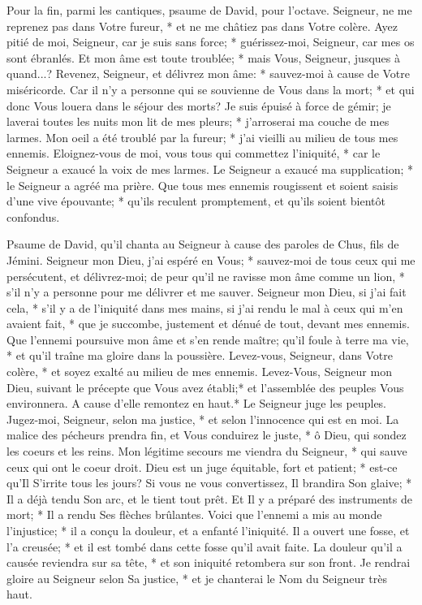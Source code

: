 Pour la fin, parmi les cantiques, psaume de David, pour l'octave.
Seigneur, ne me reprenez pas dans Votre fureur, * et ne me châtiez pas dans Votre colère.
Ayez pitié de moi, Seigneur, car je suis sans force; * guérissez-moi, Seigneur, car mes os sont ébranlés.
Et mon âme est toute troublée; * mais Vous, Seigneur, jusques à quand...?
Revenez, Seigneur, et délivrez mon âme: * sauvez-moi à cause de Votre miséricorde.
Car il n'y a personne qui se souvienne de Vous dans la mort; * et qui donc Vous louera dans le séjour des morts?
Je suis épuisé à force de gémir; je laverai toutes les nuits mon lit de mes pleurs; * j'arroserai ma couche de mes larmes.
Mon oeil a été troublé par la fureur; * j'ai vieilli au milieu de tous mes ennemis.
Eloignez-vous de moi, vous tous qui commettez l'iniquité, * car le Seigneur a exaucé la voix de mes larmes.
Le Seigneur a exaucé ma supplication; * le Seigneur a agréé ma prière.
Que tous mes ennemis rougissent et soient saisis d'une vive épouvante; * qu'ils reculent promptement, et qu'ils soient bientôt confondus.

Psaume de David, qu'il chanta au Seigneur à cause des paroles de Chus, fils de Jémini.
Seigneur mon Dieu, j'ai espéré en Vous; * sauvez-moi de tous ceux qui me persécutent, et délivrez-moi;
de peur qu'il ne ravisse mon âme comme un lion, * s'il n'y a personne pour me délivrer et me sauver.
Seigneur mon Dieu, si j'ai fait cela, * s'il y a de l'iniquité dans mes mains,
si j'ai rendu le mal à ceux qui m'en avaient fait, * que je succombe, justement et dénué de tout, devant mes ennemis.
Que l'ennemi poursuive mon âme et s'en rende maître; qu'il foule à terre ma vie, * et qu'il traîne ma gloire dans la poussière.
Levez-vous, Seigneur, dans Votre colère, * et soyez exalté au milieu de mes ennemis. Levez-Vous, Seigneur mon Dieu, suivant le précepte que Vous avez établi;*
et l'assemblée des peuples Vous environnera. A cause d'elle remontez en haut.*
Le Seigneur juge les peuples. Jugez-moi, Seigneur, selon ma justice, * et selon l'innocence qui est en moi.
La malice des pécheurs prendra fin, et Vous conduirez le juste, * ô Dieu, qui sondez les coeurs et les reins.
Mon légitime secours me viendra du Seigneur, * qui sauve ceux qui ont le coeur droit.
Dieu est un juge équitable, fort et patient; * est-ce qu'Il S'irrite tous les jours?
Si vous ne vous convertissez, Il brandira Son glaive; * Il a déjà tendu Son arc, et le tient tout prêt.
Et Il y a préparé des instruments de mort; * Il a rendu Ses flèches brûlantes.
Voici que l'ennemi a mis au monde l'injustice; * il a conçu la douleur, et a enfanté l'iniquité.
Il a ouvert une fosse, et l'a creusée; * et il est tombé dans cette fosse qu'il avait faite.
La douleur qu'il a causée reviendra sur sa tête, * et son iniquité retombera sur son front.
Je rendrai gloire au Seigneur selon Sa justice, * et je chanterai le Nom du Seigneur très haut.

